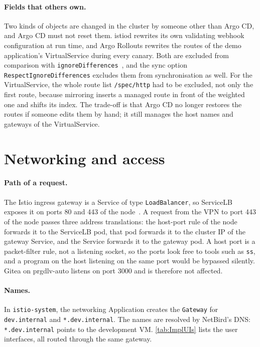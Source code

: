 \paragraph{Fields that others own.} Two kinds of objects are changed in the cluster by someone other than Argo CD, and Argo CD must not reset them. istiod rewrites its own validating webhook configuration at run time, and Argo Rollouts rewrites the routes of the demo application's VirtualService during every canary. Both are excluded from comparison with \texttt{ignoreDifferences}~\cite{ArgoCDDiffing}, and the sync option \texttt{RespectIgnoreDifferences} excludes them from synchronisation as well. For the VirtualService, the whole route list \texttt{/spec/http} had to be excluded, not only the first route, because mirroring inserts a managed route in front of the weighted one and shifts its index. The trade-off is that Argo CD no longer restores the routes if someone edits them by hand; it still manages the host names and gateways of the VirtualService.

\section{Networking and access}
\label{sec:ImplNetworking}
\paragraph{Path of a request.} The Istio ingress gateway is a Service of type \texttt{LoadBalancer}, so ServiceLB exposes it on ports 80 and 443 of the node~\cite{K3sServiceLB}. A request from the VPN to port 443 of the node passes three address translations: the host-port rule of the node forwards it to the ServiceLB pod, that pod forwards it to the cluster IP of the gateway Service, and the Service forwards it to the gateway pod. A host port is a packet-filter rule, not a listening socket, so the ports look free to tools such as \texttt{ss}, and a program on the host listening on the same port would be bypassed silently. Gitea on prgdlv-auto listens on port 3000 and is therefore not affected.

\paragraph{Names.} In \texttt{istio-system}, the networking Application creates the \texttt{Gateway} for \texttt{dev.internal} and \texttt{*.dev.internal}. The names are resolved by NetBird's DNS: \texttt{*.dev.internal} points to the development VM. \autoref{tab:ImplUIs} lists the user interfaces, all routed through the same gateway.

